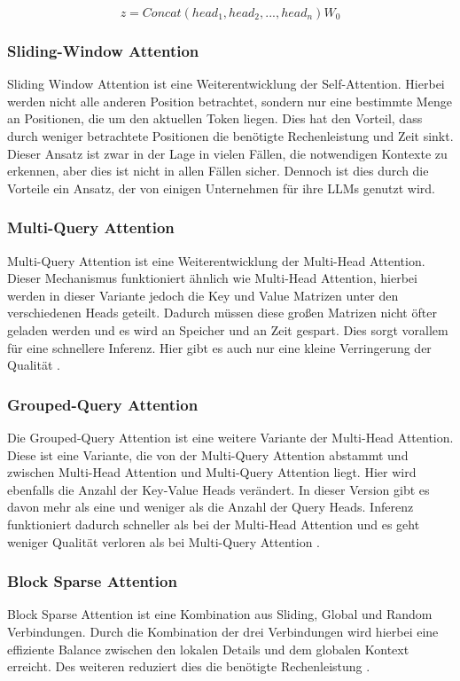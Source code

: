 \[z = Concat(head_1, head_2, ..., head_n)W_0\]

\subsubsection{Sliding-Window Attention}
\label{swa}
Sliding Window Attention ist eine Weiterentwicklung der Self-Attention.
Hierbei werden nicht alle anderen Position betrachtet, sondern nur 
eine bestimmte Menge an Positionen, die um den aktuellen Token liegen.
Dies hat den Vorteil, dass durch weniger betrachtete Positionen 
die benötigte Rechenleistung und Zeit sinkt.
Dieser Ansatz ist zwar in der Lage in vielen Fällen, die notwendigen 
Kontexte zu erkennen, aber dies ist nicht in allen Fällen sicher. Dennoch
ist dies durch die Vorteile ein Ansatz, der von einigen Unternehmen 
für ihre LLMs genutzt wird.
\cite{beltagyLongformerLongDocumentTransformer2020, gemmateamGemmaImprovingOpen2024}

\subsubsection{Multi-Query Attention}
\label{mqa}
Multi-Query Attention ist eine Weiterentwicklung der Multi-Head Attention.
Dieser Mechanismus funktioniert ähnlich wie Multi-Head Attention, hierbei 
werden in dieser Variante jedoch die Key und Value Matrizen unter den 
verschiedenen Heads geteilt. Dadurch müssen diese großen Matrizen nicht
öfter geladen werden und es wird an Speicher und an Zeit gespart. 
Dies sorgt vorallem für eine schnellere Inferenz.
Hier gibt es auch nur eine kleine Verringerung der Qualität \cite{shazeerFastTransformerDecoding2019}.

\subsubsection{Grouped-Query Attention}
\label{gqa}
Die Grouped-Query Attention ist eine weitere Variante der Multi-Head 
Attention. Diese ist eine Variante, die von der Multi-Query Attention
abstammt und zwischen Multi-Head Attention und Multi-Query 
Attention liegt. Hier wird ebenfalls die Anzahl der Key-Value Heads verändert. 
In dieser Version gibt es davon mehr als eine und weniger als die Anzahl der 
Query Heads.
Inferenz funktioniert dadurch schneller als bei der Multi-Head Attention
und es geht weniger Qualität verloren als bei Multi-Query Attention \cite{ainslieGQATrainingGeneralized2023}.

\subsubsection{Block Sparse Attention}
\label{bsa}
Block Sparse Attention ist eine Kombination 
aus Sliding, Global und Random Verbindungen.
Durch die Kombination der drei Verbindungen
wird hierbei eine effiziente Balance zwischen den 
lokalen Details und dem globalen Kontext erreicht.
Des weiteren reduziert dies die benötigte 
Rechenleistung \cite{blockSparse}.


